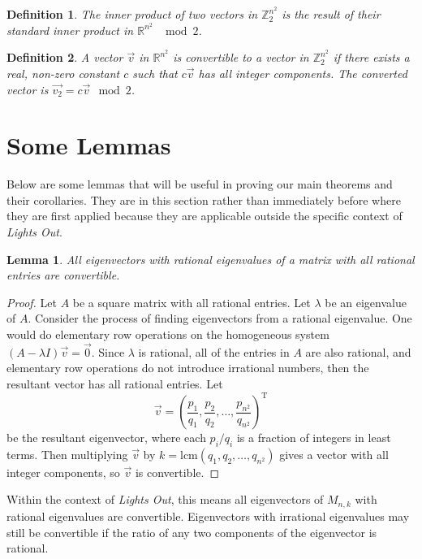 \documentclass[12pt]{article}
\newtheorem{definition}{Definition}
\newtheorem{lemma}{Lemma}
\newcommand{\Z}{\mathbb{Z}}
\newcommand{\R}{\mathbb{R}}
\begin{document}
	\begin{definition}\label{def:innerprod}
		The inner product of two vectors in $\Z_{2}^{n^2}$ is the result of their
		standard inner product in $\R^{n^2}$ $\mod 2$.
	\end{definition}
	\begin{definition}\label{def:converted}
		A vector $\vec{v}$ in $\R^{n^2}$ is convertible to a vector in $\Z_{2}^{n^2}$
		if there exists a real, non-zero constant $c$ such that $c\vec{v}$ has all
		integer components. 
		The converted vector is $\vec{v_2} = c\vec{v} \mod 2$.
	\end{definition}
	
	\section{Some Lemmas}
	Below are some lemmas that will be useful in proving our main theorems and
	their corollaries. They are in this section rather than immediately before where
	they are first applied because they are applicable outside the specific context
	of \textit{Lights Out}.
	\begin{lemma}\label{lem:convert}
		All eigenvectors with rational eigenvalues of a matrix with all rational
		entries are convertible.
	\end{lemma}
	\begin{proof}
		Let $A$ be a square matrix with all rational entries. 
		Let $\lambda$ be an eigenvalue of $A$.
		Consider the process of finding eigenvectors from a rational eigenvalue. 
		One would do elementary row operations on the homogeneous system $(A-\lambda
		I)\vec{v} = \vec{0}$. 
		Since $\lambda$ is rational, all of the entries in $A$ are also rational, and
		elementary row operations do not introduce irrational numbers, then the
		resultant vector has all rational entries. 
		Let
		\begin{equation*}
		\vec{v} = \left(\frac{p_1}{q_1}, \frac{p_2}{q_2}, \ldots,
		\frac{p_{n^2}}{q_{n^2}}\right)^\text{T}
		\end{equation*}
		be the resultant eigenvector, where each $p_i / q_i$ is a fraction of integers
		in least terms.
		Then multiplying $\vec{v}$ by $k = \text{lcm}{\left(q_1, q_2, \ldots,
			q_{n^2}\right)}$ gives a vector with all integer components, so $\vec{v}$ is
		convertible.
	\end{proof}
	Within the context of \textit{Lights Out}, this means all eigenvectors of
	$M_{n,k}$ with rational eigenvalues are convertible.
	Eigenvectors with irrational eigenvalues may still be convertible if the ratio
	of any two components of the eigenvector is rational.
	
\end{document}
